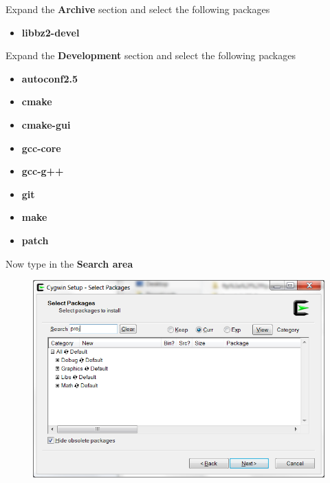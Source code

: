 \noindent Expand the \textbf{Archive} section and select the following packages

\begin{itemize}
\item \textbf{libbz2-devel}
\end{itemize}

\noindent Expand the \textbf{Development} section and select the following packages

\begin{itemize}
\item \textbf{autoconf2.5}
\item \textbf{cmake}
\item \textbf{cmake-gui}
\item \textbf{gcc-core}
\item \textbf{gcc-g++}
\item \textbf{git}
\item \textbf{make}
\item \textbf{patch}
\end{itemize}



\pagebreak

Now type  in the \textbf{Search area}

\begin{figure}[h]
  \includegraphics[width=\textwidth]{2015/Aug/25/proj1.png}
\end{figure}

